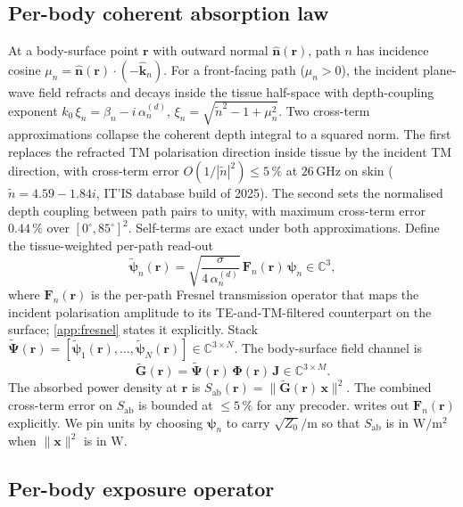 \documentclass[journal,twocolumn,10pt]{IEEEtran}
\theoremstyle{plain}
\theoremstyle{remark}
\newcommand{\khat}{\hat{\bm{k}}}
\newcommand{\nhat}{\hat{\bm{n}}}
\newcommand{\rr}{\mathbf{r}}
\newcommand{\xx}{\mathbf{x}}
\newcommand{\Sab}{S_{\mathrm{ab}}}
\newcommand{\Gtil}{\tilde{\mathbf{G}}}
\newcommand{\Jmat}{\mathbf{J}}
\newcommand{\Phimat}{\mathbf{\Phi}}
\newcommand{\Psitil}{\tilde{\bm{\Psi}}}
\newcommand{\Fn}{\mathbf{F}_n}
\newcommand{\psin}{\bm{\psi}_n}
\newcommand{\Complex}{\mathbb{C}}
\newcommand{\ntilde}{\tilde{n}}
\begin{document}
\subsection{Per-body coherent absorption law}\label{sec:cohlaw}

At a body-surface point $\rr$ with outward normal $\nhat(\rr)$, path
$n$ has incidence cosine $\mu_n = \nhat(\rr)\cdot(-\khat_n)$. For a
front-facing path ($\mu_n > 0$), the incident plane-wave field
refracts and decays inside the tissue half-space with depth-coupling
exponent $k_0\,\xi_n = \beta_n - i\,\alpha_n^{(d)}$,
$\xi_n = \sqrt{\ntilde^2 - 1 + \mu_n^2}$. Two cross-term
approximations collapse the coherent depth integral to a squared
norm. The first replaces the refracted TM polarisation direction
inside tissue by the incident TM direction, with cross-term error
$O(1/|\ntilde|^2) \leq 5\,\%$ at $26\,$GHz on skin
($\ntilde = 4.59 - 1.84i$, IT'IS database build of 2025). The second
sets the normalised depth coupling between path pairs to unity, with
maximum cross-term error $0.44\,\%$ over $[0^\circ, 85^\circ]^2$.
Self-terms are exact under both approximations. Define the
tissue-weighted per-path read-out
\begin{equation}\label{eq:psitil}
  \tilde{\bm\psi}_n(\rr) = \sqrt{\frac{\sigma}{4\,\alpha_n^{(d)}}}\,
  \Fn(\rr)\,\psin \in \Complex^3,
\end{equation}
where $\Fn(\rr)$ is the per-path Fresnel transmission operator that
maps the incident polarisation amplitude to its TE-and-TM-filtered
counterpart on the surface; \cref{app:fresnel} states it explicitly.
Stack
$\Psitil(\rr) = [\tilde{\bm\psi}_1(\rr), \ldots,
\tilde{\bm\psi}_N(\rr)] \in \Complex^{3 \times N}$. The body-surface
field channel is
\begin{equation}\label{eq:Gtilde}
  \Gtil(\rr) = \Psitil(\rr)\,\Phimat(\rr)\,\Jmat
  \in \Complex^{3 \times M}.
\end{equation}
The absorbed power density at $\rr$ is
$\Sab(\rr) = \|\Gtil(\rr)\,\xx\|^2$. The combined cross-term error
on $\Sab$ is bounded at $\leq 5\,\%$ for any precoder.
 writes out $\Fn(\rr)$ explicitly. We pin units by
choosing $\psin$ to carry $\sqrt{Z_0}/$m so that $\Sab$ is in
$\mathrm{W}/\mathrm{m}^2$ when $\|\xx\|^2$ is in $\mathrm{W}$.

\subsection{Per-body exposure operator}\label{sec:Q}
\end{document}
